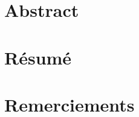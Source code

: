 \cleardoublepage
\setcounter{page}{1}

\chapter{Abstract}



\cleardoublepage


\chapter{R\'esum\'e}






\cleardoublepage
\chapter{Remerciements}






